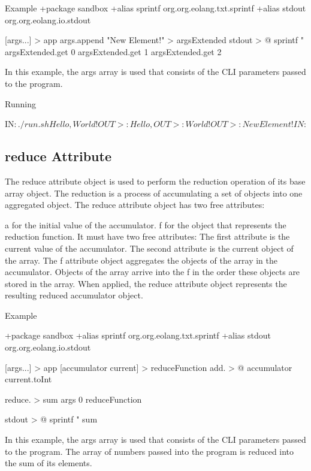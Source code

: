 \documentclass[12pt]{book}
\begin{document}
\begin{ffcode}
Example
+package sandbox
+alias sprintf org.org.eolang.txt.sprintf
+alias stdout org.org.eolang.io.stdout

[args...] > app
  args.append "New Element!" > argsExtended
  stdout > @
    sprintf
      "%
      argsExtended.get 0
      argsExtended.get 1
      argsExtended.get 2

\end{ffcode}
In this example, the args array is used that consists of the CLI parameters passed to the program.

Running
\begin{ffcode}
IN$: ./run.sh Hello, World!
OUT>: Hello,
OUT>: World!
OUT>: New Element!
IN$: 
\end{ffcode}

\subsection{reduce Attribute}
The reduce attribute object is used to perform the reduction operation of its base array object. The reduction is a process of accumulating a set of objects into one aggregated object.
The reduce attribute object has two free attributes:

a for the initial value of the accumulator.
f for the object that represents the reduction function. It must have two free attributes:
The first attribute is the current value of the accumulator.
The second attribute is the current object of the array.
The f attribute object aggregates the objects of the array in the accumulator. Objects of the array arrive into the f in the order these objects are stored in the array.
When applied, the reduce attribute object represents the resulting reduced accumulator object.

Example
\begin{ffcode}
+package sandbox
+alias sprintf org.org.eolang.txt.sprintf
+alias stdout org.org.eolang.io.stdout

[args...] > app
  [accumulator current] > reduceFunction
    add. > @
      accumulator
      current.toInt

  reduce. > sum
    args
    0
    reduceFunction

  stdout > @
    sprintf
      "%
      sum
\end{ffcode}

In this example, the args array is used that consists of the CLI parameters passed to the program. The array of numbers passed into the program is reduced into the sum of its elements.
\end{document}
